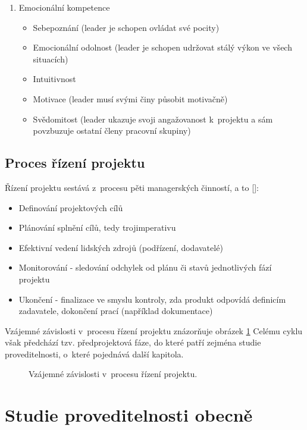\documentclass[
	11pt, oneside, printed, final, palatino, monochrome
	microtype,
	table,   %
	lof,     %
	lot     %
]{fithesis3}
\newcommand{\citepages}[2]{[\cite[#1]{#2}]}
\newcommand{\mezera}{\bigskip}
\begin{document}
{\begin{enumerate}
\begin{itemize}
\end{itemize}
\item Emocionální kompetence
\begin{itemize}
\item Sebepoznání (leader je schopen ovládat své pocity)
\item Emocionální odolnost (leader je schopen udržovat stálý výkon ve všech situacích)
\item Intuitivnost
\item Motivace (leader musí svými činy působit motivačně)
\item Svědomitost (leader ukazuje svoji angažovanost k~projektu a sám povzbuzuje ostatní členy pracovní skupiny)
\end{itemize}
\end{enumerate}

\subsection{Proces řízení projektu}
Řízení projektu sestává z~procesu pěti managerských činností, a to \citepages{22-23}{rehacek_2013}:
\mezera
\begin{itemize}
\item Definování projektových cílů
\item Plánování splnění cílů, tedy trojimperativu
\item Efektivní vedení lidských zdrojů (podřízení, dodavatelé)
\item Monitorování - sledování odchylek od plánu či stavů jednotlivých fází projektu
\item Ukončení - finalizace ve smyslu kontroly, zda produkt odpovídá definicím zadavatele, dokončení prací (například dokumentace)
\end{itemize}

Vzájemné závislosti v~procesu řízení projektu znázorňuje obrázek \ref{fig:proces_rizeni_projektu}
Celému cyklu však předchází tzv. předprojektová fáze, do které patří zejména studie proveditelnosti, o~které pojednává další kapitola.

\begin{figure}
    \centering
	\def\svgwidth{2.0\textwidth}
    
	\caption{Vzájemné závislosti v~procesu řízení projektu.}
	\label{fig:proces_rizeni_projektu}
\end{figure}

\section{Studie proveditelnosti obecně} \label{sec:studie_proveditelnosti}

}
\end{document}
